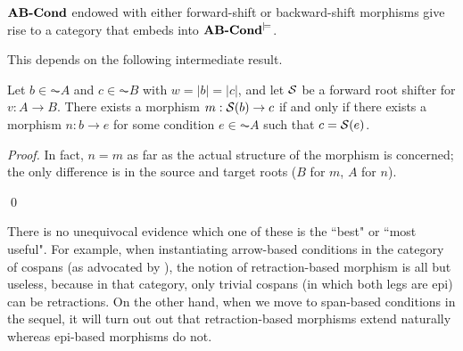 \begin{theorem}
$\textbf{AB-Cond}$ endowed with either forward-shift or backward-shift morphisms give rise to a category that embeds into $\textbf{AB-Cond}^{\models}$.
\end{theorem}

This depends on the following intermediate result.

\begin{lemma}
Let $b\in \AC A$ and $c\in \AC B$ with $w=|b|=|c|$, and let $\mathcal{S}$ be a forward root shifter for $v:A\to B$. There exists a morphism $m:\mathcal{S}(b)\to c$ if and only if there exists a morphism $n:b\to e$ for some condition $e\in \AC A$ such that $c=\mathcal{S}(e)$.
\end{lemma}
%
\begin{proof}
In fact, $n=m$ as far as the actual structure of the morphism is concerned; the only difference is in the source and target roots ($B$ for $m$, $A$ for $n$).

\qed
\end{proof}


There is no unequivocal evidence which one of these is the ``best" or ``most useful". For example, when instantiating arrow-based conditions in the category of cospans (as advocated by \cite{Koenig et al}), the notion of retraction-based morphism is all but useless, because in that category, only trivial cospans (in which both legs are epi) can be retractions. On the other hand, when we move to span-based conditions in the sequel, it will turn out out that retraction-based morphisms extend naturally whereas epi-based morphisms do not.

